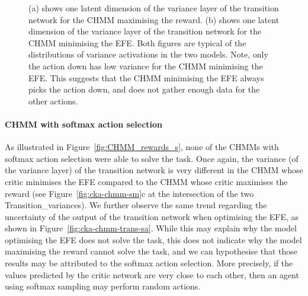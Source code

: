 \documentclass[twoside,11pt]{article}
\begin{document}
\begin{figure}[H]
    \caption{(a) shows one latent dimension of the variance layer of the transition network for the CHMM maximising the reward. (b) shows one latent dimension of the variance layer of the transition network for the CHMM minimising the EFE. Both figures are typical of the distributions of variance activations in the two models. Note, only the action down has low variance for the CHMM minimising the EFE. This suggests that the CHMM minimising the EFE always picks the action down, and does not gather enough data for the other actions.
    }
    \label{fig:cka-chmm-trans-ba}
\end{figure}

\paragraph{CHMM with softmax action selection}
As illustrated in Figure~\ref{fig:CHMM_rewards_s}, none of the CHMMs with softmax action selection were able to solve the task. Once again, the variance (of the variance layer) of the transition network is very different in the CHMM whose critic minimises the EFE compared to the CHMM whose critic maximises the reward (see Figure~\ref{fig:cka-chmm-sm}c at the intersection of the two Transition\_variances). We further observe the same trend regarding the uncertainty of the output of the transition network when optimising the EFE, as shown in Figure~\ref{fig:cka-chmm-trans-sa}. While this may explain why the model optimising the EFE does not solve the task, this does not indicate why the model maximising the reward cannot solve the task, and we can hypothesise that those results may be attributed to the softmax action selection. More precisely, if the values predicted by the critic network are very close to each other, then an agent using softmax sampling may perform random actions.
\end{document}
